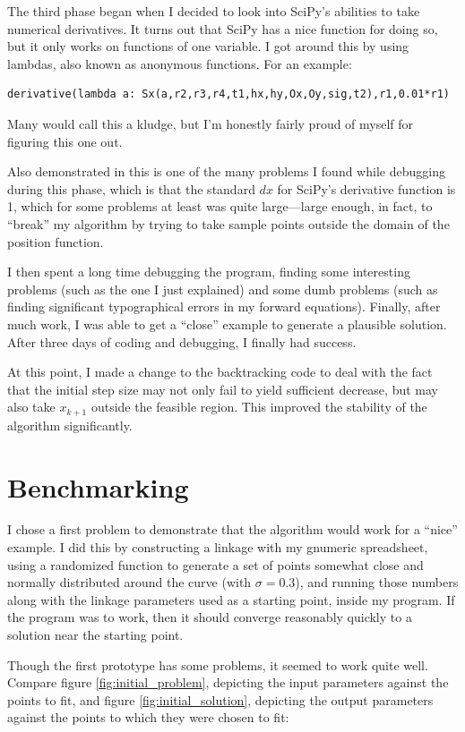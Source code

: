 \documentclass[12pt, letterpaper]{article}
\begin{document}
The third phase began when I decided to look into SciPy's abilities to take numerical derivatives. It turns out that SciPy has a nice function for doing so, but it only works on functions of one variable. I got around this by using lambdas, also known as anonymous functions. For an example:

\begin{verbatim}
derivative(lambda a: Sx(a,r2,r3,r4,t1,hx,hy,Ox,Oy,sig,t2),r1,0.01*r1)
\end{verbatim}

Many would call this a kludge, but I'm honestly fairly proud of myself for figuring this one out.

Also demonstrated in this is one of the many problems I found while debugging during this phase, which is that the standard \(dx\) for SciPy's derivative function is 1, which for some problems at least was quite large---large enough, in fact, to ``break'' my algorithm by trying to take sample points outside the domain of the position function.

I then spent a long time debugging the program, finding some interesting problems (such as the one I just explained) and some dumb problems (such as finding significant typographical errors in my forward equations). Finally, after much work, I was able to get a ``close'' example to generate a plausible solution. After three days of coding and debugging, I finally had success.

At this point, I made a change to the backtracking code to deal with the fact that the initial step size may not only fail to yield sufficient decrease, but may also take \(x_{k+1}\) outside the feasible region. This improved the stability of the algorithm significantly.

\section*{Benchmarking}

I chose a first problem to demonstrate that the algorithm would work for a ``nice'' example. I did this by constructing a linkage with my gnumeric spreadsheet, using a randomized function to generate a set of points somewhat close and normally distributed around the curve (with \(\sigma=0.3\)), and running those numbers along with the linkage parameters used as a starting point, inside my program.  If the program was to work, then it should converge reasonably quickly to a solution near the starting point.

Though the first prototype has some problems, it seemed to work quite well. Compare figure \ref{fig:initial_problem}, depicting the input parameters against the points to fit, and figure \ref{fig:initial_solution}, depicting the output parameters against the points to which they were chosen to fit:
\end{document}
